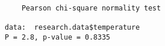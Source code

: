 \begin{verbatim} 

	Pearson chi-square normality test

data:  research.data$temperature
P = 2.8, p-value = 0.8335

\end{verbatim}